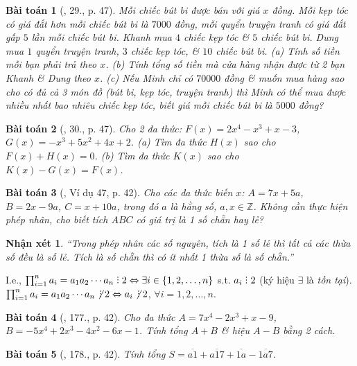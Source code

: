 \documentclass{article}
\newtheorem{baitoan}{Bài toán}
\newtheorem{nhanxet}{Nhận xét}
\DeclareRobustCommand{\divby}{%
	\mathrel{\vbox{\baselineskip.65ex\lineskiplimit0pt\hbox{.}\hbox{.}\hbox{.}}}%
}
\begin{document}
\begin{baitoan}[\cite{SBT_Toan_7_Canh_Dieu_tap_2}, 29., p. 47]
	Mỗi chiếc bút bi được bán với giá $x$ đồng. Mỗi kẹp tóc có giá đắt hơn mỗi chiếc bút bi là $7000$ đồng, mỗi quyển truyện tranh có giá đắt gấp $5$ lần mỗi chiếc bút bi. Khanh mua $4$ chiếc kẹp tóc \& $5$ chiếc bút bi. Dung mua $1$ quyển truyện tranh, $3$ chiếc kẹp tóc, \& $10$ chiếc bút bi. (a) Tính số tiền mỗi bạn phải trả theo $x$. (b) Tính tổng số tiền mà cửa hàng nhận được từ 2 bạn Khanh \& Dung theo $x$. (c) Nếu Minh chỉ có $70000$ đồng \& muốn mua hàng sao cho có đủ cả 3 món đồ (bút bi, kẹp tóc, truyện tranh) thì Minh có thể mua được nhiều nhất bao nhiêu chiếc kẹp tóc, biết giá mỗi chiếc bút bi là $5000$ đồng?
\end{baitoan}

\begin{baitoan}[\cite{SBT_Toan_7_Canh_Dieu_tap_2}, 30., p. 47]
	Cho 2 đa thức: $F(x) = 2x^4 - x^3 + x - 3$, $G(x) = -x^3 + 5x^2 + 4x + 2$. (a) Tìm đa thức $H(x)$ sao cho $F(x) + H(x) = 0$. (b) Tìm đa thức $K(x)$ sao cho $K(x) - G(x) = F(x)$.
\end{baitoan}

\begin{baitoan}[\cite{Tuyen_Toan_7}, Ví dụ 47, p. 42]
	Cho các đa thức biến $x$: $A = 7x + 5a$, $B = 2x - 9a$, $C = x + 10a$, trong đó $a$ là hằng số, $a,x\in\mathbb{Z}$. Không cần thực hiện phép nhân, cho biết tích $ABC$ có giá trị là 1 số chẵn hay lẻ?
\end{baitoan}

\begin{nhanxet}
	``Trong phép nhân các số nguyên, tích là 1 số lẻ thì tất cả các thừa số đều là số lẻ. Tích là số chẵn thì có ít nhất 1 thừa số là số chẵn.''
\end{nhanxet}
I.e., $\prod_{i=1}^n a_i = a_1a_2\cdots a_n\divby2\Leftrightarrow\exists i\in\{1,2,\ldots,n\}$ s.t. $a_i\divby2$ (ký hiệu $\exists$ là \textit{tồn tại}). $\prod_{i=1}^n a_i = a_1a_2\cdots a_n\not\,\divby2\Leftrightarrow a_i\not\,\divby2$, $\forall i = 1,2,\ldots,n$.

\begin{baitoan}[\cite{Tuyen_Toan_7}, 177., p. 42]
	Cho đa thức $A = 7x^4 - 2x^3 + x - 9$, $B = -5x^4 + 2x^3 - 4x^2 - 6x - 1$. Tính tổng $A + B$ \& hiệu $A - B$ bằng 2 cách.
\end{baitoan}

\begin{baitoan}[\cite{Tuyen_Toan_7}, 178., p. 42]
	Tính tổng $S = \overline{a1} + \overline{a17} + \overline{1a} - \overline{1a7}$.
\end{baitoan}
\end{document}
